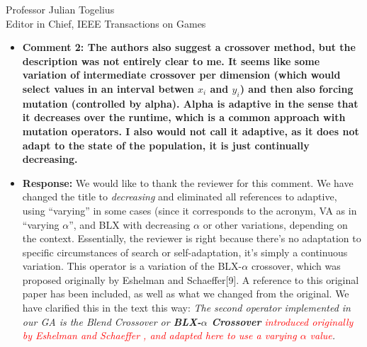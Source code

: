 \documentclass[10pt]{letter} %
\begin{document}
\begin{letter}{Professor Julian Togelius \\ Editor in Chief, IEEE Transactions on Games}
\begin{enumerate}
\begin{itemize}
%		 
		\item {\bf   Comment 2:	The authors also suggest a crossover method, but the description was not entirely clear to me. It seems like some variation of intermediate crossover per dimension (which would select values in an interval betwen $x_i$ and $y_i$) and then also forcing mutation (controlled by alpha). Alpha is adaptive in the sense that it decreases over the runtime, which is a common approach with mutation operators. I also would not call it adaptive, as it does not adapt to the state of the population, it is just continually decreasing.}
		\item {\bf Response:}
		We would like to thank the reviewer for this comment.
                We have changed the title to {\em decreasing} and eliminated all references to adaptive, using ``varying'' in some cases (since it corresponds to the acronym, VA as in ``varying $\alpha$'', and BLX with decreasing $\alpha$ or other variations, depending on the context. Essentially, the reviewer is right because there's no adaptation to specific circumstances of search or self-adaptation, it's simply a continuous variation. This operator is a variation of the BLX-$\alpha$ crossover, which was proposed originally by Eshelman and Schaeffer[9]. A reference to this original paper has been included, as well as what we changed from the original. We have clarified this in the text this way: {\em The second operator implemented in our GA is the Blend Crossover or \textbf{BLX-$\alpha$ Crossover} {\sf [9]} \textcolor{red}{introduced originally by Eshelman and Schaeffer {\sf [11]}, and adapted here to use a varying $\alpha$ value}.}


\end{itemize}
\end{enumerate}
\end{letter}
\end{document}
